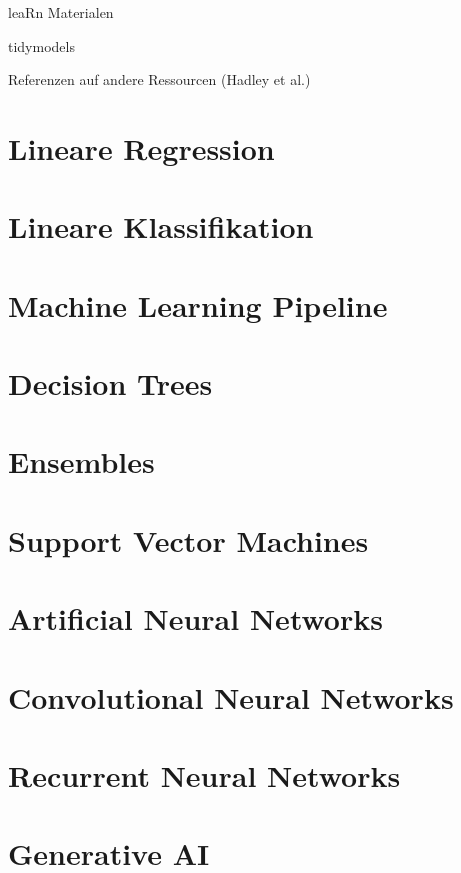 \documentclass[
]{book}
\begin{document}
leaRn Materialen

tidymodels

Referenzen auf andere Ressourcen (Hadley et al.)

\hypertarget{lin-reg}{%
\chapter{Lineare Regression}\label{lin-reg}}

\hypertarget{lin-class}{%
\chapter{Lineare Klassifikation}\label{lin-class}}

\hypertarget{ml-pipeline}{%
\chapter{Machine Learning Pipeline}\label{ml-pipeline}}

\hypertarget{trees}{%
\chapter{Decision Trees}\label{trees}}

\hypertarget{ensembles}{%
\chapter{Ensembles}\label{ensembles}}

\hypertarget{svm}{%
\chapter{Support Vector Machines}\label{svm}}

\hypertarget{ann}{%
\chapter{Artificial Neural Networks}\label{ann}}

\hypertarget{cnn}{%
\chapter{Convolutional Neural Networks}\label{cnn}}

\hypertarget{rnn}{%
\chapter{Recurrent Neural Networks}\label{rnn}}

\hypertarget{gen-AI}{%
\chapter{Generative AI}\label{gen-AI}}

  
\end{document}
